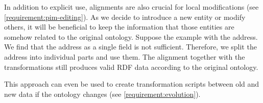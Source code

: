In addition to explicit use, alignments are also crucial for local modifications (see \autoref{requirement:pim-editing}). As we decide to introduce a new entity or modify others, it will be beneficial to keep the information that those entities are somehow related to the original ontology. Suppose the example with the address. We find that the address as a single field is not sufficient. Therefore, we split the address into individual parts and use them. The alignment together with the transformations still produces valid RDF data according to the original ontology.

This approach can even be used to create transformation scripts between old and new data if the ontology changes (see \autoref{requirement:evolution}). %

